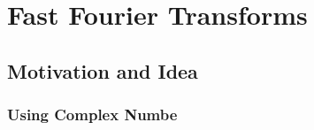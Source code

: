 \chapter{Fast Fourier Transforms}



\section{Motivation and Idea}


\subsection{Using Complex Numbe}